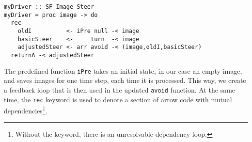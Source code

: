 \begin{lstlisting}[float,caption=Using ArrowLoop to send feedback,label=lst:loop]
myDriver :: SF Image Steer
myDriver = proc image -> do
  rec
    oldI          <- iPre null -< image
    basicSteer    <-     turn  -< image
    adjustedSteer <- arr avoid -< (image,oldI,basicSteer)
  returnA -< adjustedSteer
\end{lstlisting}

The predefined function \texttt{iPre} takes an initial state, in our case an empty image, and saves images for one time step, each time it is processed.
This way, we create a feedback loop that is then used in the updated \texttt{avoid} function.
At the same time, the \texttt{rec} keyword is used to denote a section of arrow code with  mutual dependencies\footnote{Without the keyword, there is an unresolvable dependency loop.}.



 